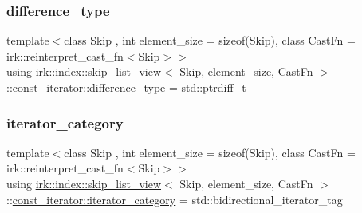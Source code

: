\subsubsection{\texorpdfstring{difference\+\_\+type}{difference\_type}}
{\footnotesize\ttfamily template$<$class Skip , int element\+\_\+size = sizeof(\+Skip), class Cast\+Fn  = irk\+::reinterpret\+\_\+cast\+\_\+fn$<$\+Skip$>$$>$ \\
using \mbox{\hyperlink{classirk_1_1index_1_1skip__list__view}{irk\+::index\+::skip\+\_\+list\+\_\+view}}$<$ Skip, element\+\_\+size, Cast\+Fn $>$\+::\mbox{\hyperlink{structirk_1_1index_1_1skip__list__view_1_1const__iterator_afcba20bb907a231114679979015f77f5}{const\+\_\+iterator\+::difference\+\_\+type}} =  std\+::ptrdiff\+\_\+t}

\mbox{\label{structirk_1_1index_1_1skip__list__view_1_1const__iterator_aec63e523272f39b50e8420c465440494}} 
\subsubsection{\texorpdfstring{iterator\+\_\+category}{iterator\_category}}
{\footnotesize\ttfamily template$<$class Skip , int element\+\_\+size = sizeof(\+Skip), class Cast\+Fn  = irk\+::reinterpret\+\_\+cast\+\_\+fn$<$\+Skip$>$$>$ \\
using \mbox{\hyperlink{classirk_1_1index_1_1skip__list__view}{irk\+::index\+::skip\+\_\+list\+\_\+view}}$<$ Skip, element\+\_\+size, Cast\+Fn $>$\+::\mbox{\hyperlink{structirk_1_1index_1_1skip__list__view_1_1const__iterator_aec63e523272f39b50e8420c465440494}{const\+\_\+iterator\+::iterator\+\_\+category}} =  std\+::bidirectional\+\_\+iterator\+\_\+tag}

\mbox{\label{structirk_1_1index_1_1skip__list__view_1_1const__iterator_a1bce3758616ad33105fa64b68a03bd8b}} 
